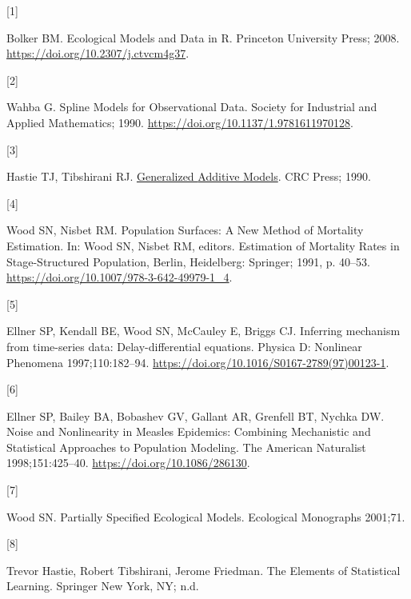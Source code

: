 \documentclass[
11pt, %
oneside, %
english, %
singlespacing, %
]{macthesis} %
\newlength{\cslhangindent}
\newlength{\csllabelwidth}
\newenvironment{CSLReferences}[2] %
{\begin{list}{}{%
	\setlength{\itemindent}{0pt}
	\setlength{\leftmargin}{0pt}
	\setlength{\parsep}{0pt}
	\ifodd #1
	\setlength{\leftmargin}{\cslhangindent}
	\setlength{\itemindent}{-1\cslhangindent}
	\fi
	\setlength{\itemsep}{#2\baselineskip}}}
{\end{list}}
\newcommand{\CSLLeftMargin}[1]{\parbox[t]{\csllabelwidth}{\strut#1\strut}}
\newcommand{\CSLRightInline}[1]{\parbox[t]{\linewidth - \csllabelwidth}{\strut#1\strut}}
\begin{document}
\label{refs}
\begin{CSLReferences}{0}{0}
\CSLLeftMargin{{[}1{]} }%
\CSLRightInline{Bolker BM. Ecological {Models} and {Data} in {R}. Princeton University Press; 2008. \url{https://doi.org/10.2307/j.ctvcm4g37}.}

\CSLLeftMargin{{[}2{]} }%
\CSLRightInline{Wahba G. Spline {Models} for {Observational Data}. {Society for Industrial and Applied Mathematics}; 1990. \url{https://doi.org/10.1137/1.9781611970128}.}

\CSLLeftMargin{{[}3{]} }%
\CSLRightInline{Hastie TJ, Tibshirani RJ. \href{https://books.google.com?id=qa29r1Ze1coC}{Generalized {Additive Models}}. CRC Press; 1990.}

\CSLLeftMargin{{[}4{]} }%
\CSLRightInline{Wood SN, Nisbet RM. Population {Surfaces}: {A New Method} of {Mortality Estimation}. In: Wood SN, Nisbet RM, editors. Estimation of {Mortality Rates} in {Stage-Structured Population}, Berlin, Heidelberg: Springer; 1991, p. 40--53. \url{https://doi.org/10.1007/978-3-642-49979-1_4}.}

\CSLLeftMargin{{[}5{]} }%
\CSLRightInline{Ellner SP, Kendall BE, Wood SN, McCauley E, Briggs CJ. Inferring mechanism from time-series data: {Delay-differential} equations. Physica D: Nonlinear Phenomena 1997;110:182--94. \url{https://doi.org/10.1016/S0167-2789(97)00123-1}.}

\CSLLeftMargin{{[}6{]} }%
\CSLRightInline{Ellner SP, Bailey BA, Bobashev GV, Gallant AR, Grenfell BT, Nychka DW. Noise and {Nonlinearity} in {Measles Epidemics}: {Combining Mechanistic} and {Statistical Approaches} to {Population Modeling}. The American Naturalist 1998;151:425--40. \url{https://doi.org/10.1086/286130}.}

\CSLLeftMargin{{[}7{]} }%
\CSLRightInline{Wood SN. Partially {Specified Ecological Models}. Ecological Monographs 2001;71.}

\CSLLeftMargin{{[}8{]} }%
\CSLRightInline{Trevor Hastie, Robert Tibshirani, Jerome Friedman. The {Elements} of {Statistical Learning}. Springer New York, NY; n.d.}


\end{CSLReferences}
\end{document}
